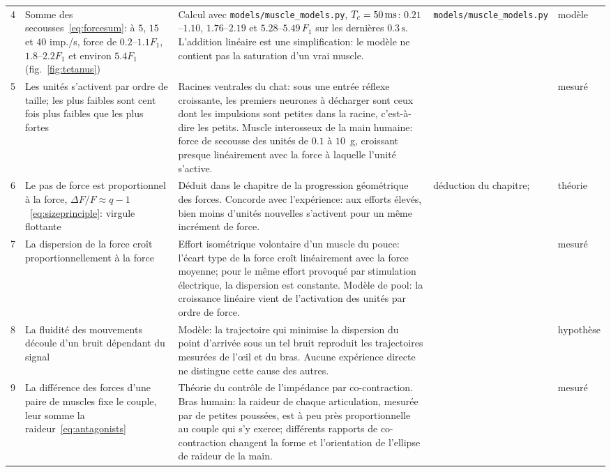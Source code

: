 {\begin{longtable}{>{\raggedright}p{0.5cm}>{\raggedright}p{4.0cm}>{\raggedright}p{5.6cm}>{\raggedright}p{2.3cm}>{\raggedright\arraybackslash}p{1.7cm}}
4 & Somme des secousses~\eqref{eq:forcesum}: à $5$, $15$ et $40$ imp./s, force de $0.2$--$1.1F_1$, $1.8$--$2.2F_1$ et environ $5.4F_1$ (fig.~\ref{fig:tetanus}) & Calcul avec \texttt{models/\allowbreak muscle\_\allowbreak models.py}, $T_c=50\,\text{ms}$: $0.21$--$1.10$, $1.76$--$2.19$ et $5.28$--$5.49\,F_1$ sur les dernières $0.3\,\text{s}$. L'addition linéaire est une simplification: le modèle ne contient pas la saturation d'un vrai muscle. & \texttt{models/\allowbreak muscle\_\allowbreak models.py} & modèle \\
5 & Les unités s'activent par ordre de taille; les plus faibles sont cent fois plus faibles que les plus fortes & Racines ventrales du chat: sous une entrée réflexe croissante, les premiers neurones à décharger sont ceux dont les impulsions sont petites dans la racine, c'est-à-dire les petits. Muscle interosseux de la main humaine: force de secousse des unités de $0.1$ à $10$~g, croissant presque linéairement avec la force à laquelle l'unité s'active. & \cite{Henneman1957, MilnerBrown1973rec} & mesuré \\
6 & Le pas de force est proportionnel à la force, $\Delta F/F\approx q-1$~\eqref{eq:sizeprinciple}: virgule flottante & Déduit dans le chapitre de la progression géométrique des forces. Concorde avec l'expérience: aux efforts élevés, bien moins d'unités nouvelles s'activent pour un même incrément de force. & déduction du chapitre; \cite{MilnerBrown1973rec} & théorie \\
7 & La dispersion de la force croît proportionnellement à la force & Effort isométrique volontaire d'un muscle du pouce: l'écart type de la force croît linéairement avec la force moyenne; pour le même effort provoqué par stimulation électrique, la dispersion est constante. Modèle de pool: la croissance linéaire vient de l'activation des unités par ordre de force. & \cite{Jones2002sdn} & mesuré \\
8 & La fluidité des mouvements découle d'un bruit dépendant du signal & Modèle: la trajectoire qui minimise la dispersion du point d'arrivée sous un tel bruit reproduit les trajectoires mesurées de l'œil et du bras. Aucune expérience directe ne distingue cette cause des autres. & \cite{HarrisWolpert1998} & hypothèse \\
9 & La différence des forces d'une paire de muscles fixe le couple, leur somme la raideur~\eqref{eq:antagonists} & Théorie du contrôle de l'impédance par co-contraction. Bras humain: la raideur de chaque articulation, mesurée par de petites poussées, est à peu près proportionnelle au couple qui s'y exerce; différents rapports de co-contraction changent la forme et l'orientation de l'ellipse de raideur de la main. & \cite{Hogan1984, GomiOsu1998stiff} & mesuré \\

\end{longtable}}
